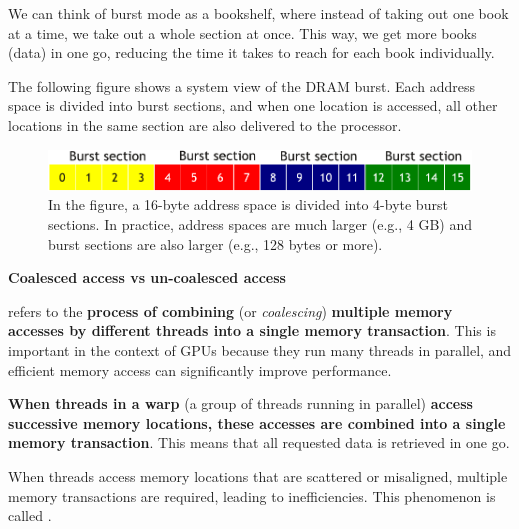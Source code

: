 \begin{examplebox}
    We can think of burst mode as a bookshelf, where instead of taking out one book at a time, we take out a whole section at once. This way, we get more books (data) in one go, reducing the time it takes to reach for each book individually.
\end{examplebox}

\newpage

\noindent
The following figure shows a system view of the DRAM burst. Each address space is divided into burst sections, and when one location is accessed, all other locations in the same section are also delivered to the processor.

\begin{figure}[!htp]
    \centering
    \includegraphics[width=.8\textwidth]{img/cuda-dram-burst-2.pdf}
    \caption{In the figure, a 16-byte address space is divided into 4-byte burst sections. In practice, address spaces are much larger (e.g., 4 GB) and burst sections are also larger (e.g., 128 bytes or more).}
\end{figure}

\noindent
\begin{flushleft}
    \textcolor{Green3}{ \textbf{Coalesced access vs un-coalesced access}}
\end{flushleft}
 refers to the \textbf{process of combining} (or \emph{coalescing}) \textbf{multiple memory accesses by different threads into a single memory transaction}. This is important in the context of GPUs because they run many threads in parallel, and efficient memory access can significantly improve performance.

\highspace
\textbf{When threads in a warp} (a group of threads running in parallel) \textbf{access successive memory locations, these accesses are combined into a single memory transaction}. This means that all requested data is retrieved in one go.

\highspace
When threads access memory locations that are scattered or misaligned, multiple memory transactions are required, leading to inefficiencies. This phenomenon is called .

